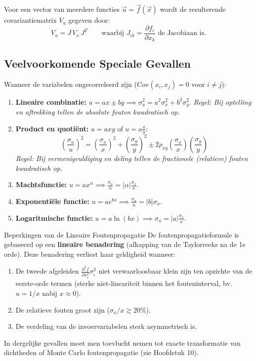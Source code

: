 \documentclass[11pt,a4paper]{article}
\newcommand{\Cov}{\text{Cov}}
\begin{document}
Voor een vector van meerdere functies $\vec{u} = \vec{f}(\vec{x})$ wordt de resulterende covariantiematrix $V_u$ gegeven door:
\begin{equation}
    V_u = J \, V_x \, J^T \qquad \text{waarbij } J_{ik} = \frac{\partial f_i}{\partial x_k} \text{ de Jacobiaan is.}
\end{equation}

\subsection{Veelvoorkomende Speciale Gevallen}
Wanneer de variabelen ongecorreleerd zijn ($\Cov(x_i, x_j) = 0$ voor $i \neq j$):
\begin{enumerate}[leftmargin=1.5em]
    \item \textbf{Lineaire combinatie:} $u = a x \pm b y \implies \sigma_u^2 = a^2 \sigma_x^2 + b^2 \sigma_y^2$.
    \emph{Regel: Bij optelling en aftrekking tellen de absolute fouten kwadratisch op.}
    \item \textbf{Product en quotiënt:} $u = a x y$ of $u = a \frac{x}{y}$:
    \begin{equation}
        \left( \frac{\sigma_u}{u} \right)^2 = \left( \frac{\sigma_x}{x} \right)^2 + \left( \frac{\sigma_y}{y} \right)^2 \pm 2 \rho_{xy} \left( \frac{\sigma_x}{x} \right) \left( \frac{\sigma_y}{y} \right)
    \end{equation}
    \emph{Regel: Bij vermenigvuldiging en deling tellen de fractionele (relatieve) fouten kwadratisch op.}
    \item \textbf{Machtsfunctie:} $u = a x^\alpha \implies \frac{\sigma_u}{u} = |\alpha| \frac{\sigma_x}{x}$.
    \item \textbf{Exponentiële functie:} $u = a e^{bx} \implies \frac{\sigma_u}{u} = |b| \sigma_x$.
    \item \textbf{Logaritmische functie:} $u = a \ln(bx) \implies \sigma_u = |a| \frac{\sigma_x}{x}$.
\end{enumerate}

\begin{theobox}{Beperkingen van de Lineaire Foutenpropagatie}
De foutenpropagatieformule is gebaseerd op een \textbf{lineaire benadering} (afkapping van de Taylorreeks na de 1e orde). Deze benadering verliest haar geldigheid wanneer:
\begin{enumerate}
    \item De tweede afgeleiden $\frac{\partial^2 f}{\partial x_i^2} \sigma_i^2$ niet verwaarloosbaar klein zijn ten opzichte van de eerste-orde termen (sterke niet-lineariteit binnen het fouteninterval, bv. $u = 1/x$ nabij $x \approx 0$).
    \item De relatieve fouten groot zijn ($\sigma_x / x \gtrsim 20\%$).
    \item De verdeling van de invoervariabelen sterk asymmetrisch is.
\end{enumerate}
In dergelijke gevallen moet men toevlucht nemen tot exacte transformatie van dichtheden of Monte Carlo foutenpropagatie (zie Hoofdstuk 10).
\end{theobox}
\end{document}
